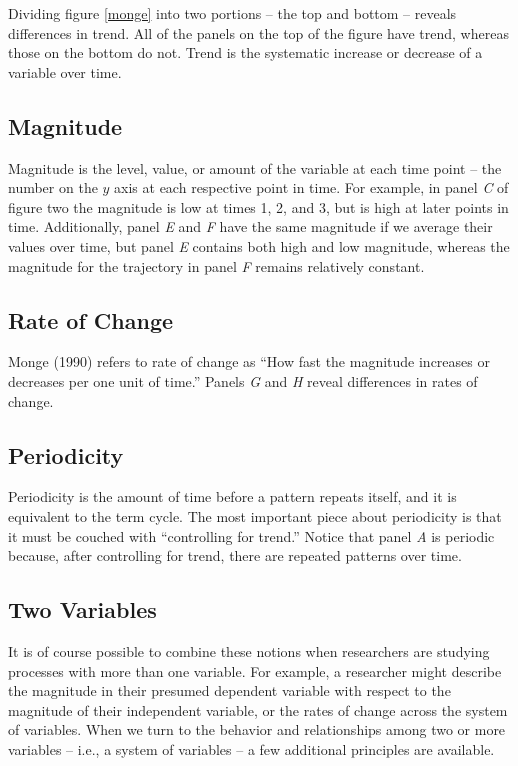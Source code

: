 \documentclass[english,,man]{apa6}
\theoremstyle{definition}
\theoremstyle{definition}
\theoremstyle{definition}
\theoremstyle{remark}
\begin{document}
Dividing figure \ref{monge} into two portions -- the top and bottom --
reveals differences in trend. All of the panels on the top of the figure
have trend, whereas those on the bottom do not. Trend is the systematic
increase or decrease of a variable over time.

\hypertarget{magnitude}{%
\subsection{Magnitude}\label{magnitude}}

Magnitude is the level, value, or amount of the variable at each time
point -- the number on the \(y\) axis at each respective point in time.
For example, in panel \emph{C} of figure two the magnitude is low at
times 1, 2, and 3, but is high at later points in time. Additionally,
panel \emph{E} and \emph{F} have the same magnitude if we average their
values over time, but panel \emph{E} contains both high and low
magnitude, whereas the magnitude for the trajectory in panel \emph{F}
remains relatively constant.

\hypertarget{rate-of-change}{%
\subsection{Rate of Change}\label{rate-of-change}}

Monge (1990) refers to rate of change as \enquote{How fast the magnitude
increases or decreases per one unit of time.} Panels \emph{G} and
\emph{H} reveal differences in rates of change.

\hypertarget{periodicity}{%
\subsection{Periodicity}\label{periodicity}}

Periodicity is the amount of time before a pattern repeats itself, and
it is equivalent to the term cycle. The most important piece about
periodicity is that it must be couched with \enquote{controlling for
trend.} Notice that panel \emph{A} is periodic because, after
controlling for trend, there are repeated patterns over time.

\hypertarget{two-variables}{%
\subsection{Two Variables}\label{two-variables}}

It is of course possible to combine these notions when researchers are
studying processes with more than one variable. For example, a
researcher might describe the magnitude in their presumed dependent
variable with respect to the magnitude of their independent variable, or
the rates of change across the system of variables. When we turn to the
behavior and relationships among two or more variables -- i.e., a system
of variables -- a few additional principles are available.
\end{document}
